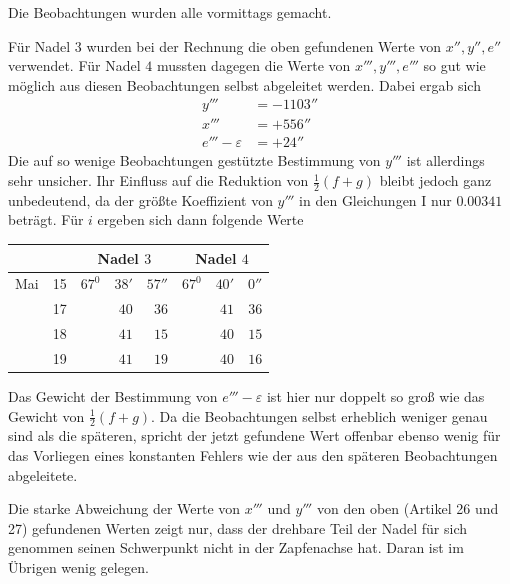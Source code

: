 Die Beobachtungen wurden alle vormittags gemacht.

Für Nadel $3$ wurden bei der Rechnung die oben gefundenen Werte von $x'',y'',e''$ verwendet. Für Nadel $4$ mussten dagegen die Werte von $x''',y''',e'''$ so gut wie möglich aus diesen Beobachtungen selbst abgeleitet werden. Dabei ergab sich
\[
\begin{aligned}
y'''&=-1103''\\
x'''&=+556''\\
e'''-\varepsilon&=+24''
\end{aligned}
\]
Die auf so wenige Beobachtungen gestützte Bestimmung von $y'''$ ist allerdings sehr unsicher. Ihr Einfluss auf die Reduktion von $\tfrac12(f+g)$ bleibt jedoch ganz unbedeutend, da der größte Koeffizient von $y'''$ in den Gleichungen I nur $0.00341$ beträgt. Für $i$ ergeben sich dann folgende Werte
\begin{center}
\begin{tabular}{rr||rrr||rrr}
\multicolumn{2}{c||}{}&\multicolumn{3}{c||}{Nadel $3$}&\multicolumn{3}{c}{Nadel $4$}\\\hline
Mai&15&$67^0$&$38'$&$57''$&$67^0$&$40'$&$0''$\\
&17&&$40$&$36$&&$41$&$36$\\
&18&&$41$&$15$&&$40$&$15$\\
&19&&$41$&$19$&&$40$&$16$
\end{tabular}
\end{center}
Das Gewicht der Bestimmung von $e'''-\varepsilon$ ist hier nur doppelt so groß wie das Gewicht von $\tfrac12(f+g)$. Da die Beobachtungen selbst erheblich weniger genau sind als die späteren, spricht der jetzt gefundene Wert offenbar ebenso wenig für das Vorliegen eines konstanten Fehlers wie der aus den späteren Beobachtungen abgeleitete.

Die starke Abweichung der Werte von $x'''$ und $y'''$ von den oben (Artikel 26 und 27) gefundenen Werten zeigt nur, dass der drehbare Teil der Nadel für sich genommen seinen Schwerpunkt nicht in der Zapfenachse hat. Daran ist im Übrigen wenig gelegen.


